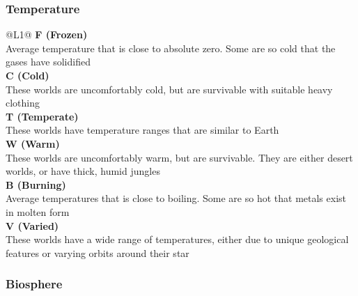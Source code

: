 \subsubsection{Temperature}

\begin{redtable}{\linewidth}{@{}L{1}@{}}
  \textbf{F (Frozen)}\\
  Average temperature that is close to absolute zero. Some are so cold that the gases have solidified\\
  \textbf{C (Cold)}\\
  These worlds are uncomfortably cold, but are survivable with suitable heavy clothing\\
  \textbf{T (Temperate)}\\
  These worlds have temperature ranges that are similar to Earth\\
  \textbf{W (Warm)}\\
  These worlds are uncomfortably warm, but are survivable. They are either desert worlds, or have thick, humid jungles\\
  \textbf{B (Burning)}\\
  Average temperatures that is close to boiling. Some are so hot that metals exist in molten form \\
  \textbf{V (Varied)}\\
  These worlds have a wide range of temperatures, either due to unique geological features or varying orbits around their star\\
\end{redtable}

\subsubsection{Biosphere}

